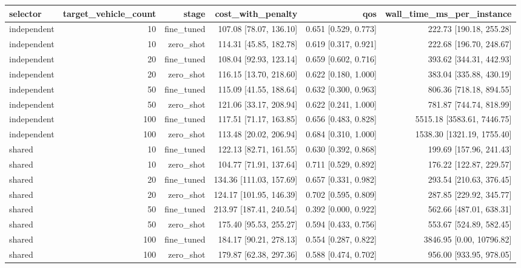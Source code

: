 \begin{tabular}{lrrrrr}
\toprule
selector & target\_vehicle\_count & stage & cost\_with\_penalty & qos & wall\_time\_ms\_per\_instance \\
\midrule
independent & 10 & fine\_tuned & 107.08 [78.07, 136.10] & 0.651 [0.529, 0.773] & 222.73 [190.18, 255.28] \\
independent & 10 & zero\_shot & 114.31 [45.85, 182.78] & 0.619 [0.317, 0.921] & 222.68 [196.70, 248.67] \\
independent & 20 & fine\_tuned & 108.04 [92.93, 123.14] & 0.659 [0.602, 0.716] & 393.62 [344.31, 442.93] \\
independent & 20 & zero\_shot & 116.15 [13.70, 218.60] & 0.622 [0.180, 1.000] & 383.04 [335.88, 430.19] \\
independent & 50 & fine\_tuned & 115.09 [41.55, 188.64] & 0.632 [0.300, 0.963] & 806.36 [718.18, 894.55] \\
independent & 50 & zero\_shot & 121.06 [33.17, 208.94] & 0.622 [0.241, 1.000] & 781.87 [744.74, 818.99] \\
independent & 100 & fine\_tuned & 117.51 [71.17, 163.85] & 0.656 [0.483, 0.828] & 5515.18 [3583.61, 7446.75] \\
independent & 100 & zero\_shot & 113.48 [20.02, 206.94] & 0.684 [0.310, 1.000] & 1538.30 [1321.19, 1755.40] \\
shared & 10 & fine\_tuned & 122.13 [82.71, 161.55] & 0.630 [0.392, 0.868] & 199.69 [157.96, 241.43] \\
shared & 10 & zero\_shot & 104.77 [71.91, 137.64] & 0.711 [0.529, 0.892] & 176.22 [122.87, 229.57] \\
shared & 20 & fine\_tuned & 134.36 [111.03, 157.69] & 0.657 [0.331, 0.982] & 293.54 [210.63, 376.45] \\
shared & 20 & zero\_shot & 124.17 [101.95, 146.39] & 0.702 [0.595, 0.809] & 287.85 [229.92, 345.77] \\
shared & 50 & fine\_tuned & 213.97 [187.41, 240.54] & 0.392 [0.000, 0.922] & 562.66 [487.01, 638.31] \\
shared & 50 & zero\_shot & 175.40 [95.53, 255.27] & 0.594 [0.433, 0.756] & 553.67 [524.89, 582.45] \\
shared & 100 & fine\_tuned & 184.17 [90.21, 278.13] & 0.554 [0.287, 0.822] & 3846.95 [0.00, 10796.82] \\
shared & 100 & zero\_shot & 179.87 [62.38, 297.36] & 0.588 [0.474, 0.702] & 956.00 [933.95, 978.05] \\
\bottomrule
\end{tabular}

